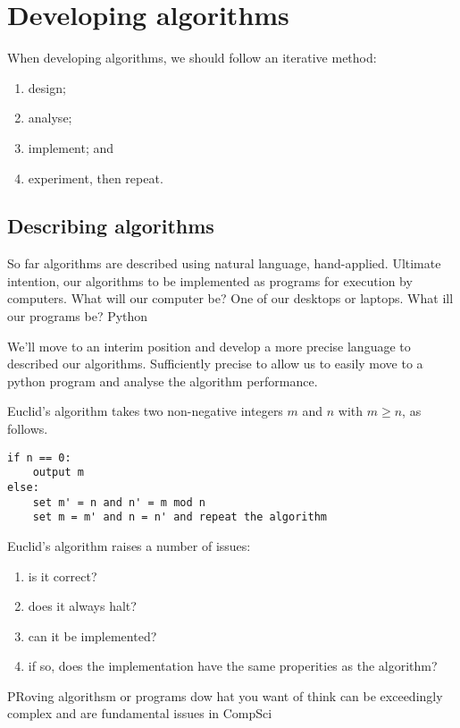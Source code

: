 \chapter{Developing algorithms}

When developing algorithms, we should follow an iterative method:

\begin{enumerate}
    \item design;
    \item analyse;
    \item implement; and
    \item experiment, then repeat.
\end{enumerate}

\section{Describing algorithms}

So far algorithms are described using natural language, hand-applied. Ultimate intention, our algorithms to be implemented as programs for execution by computers. What will our computer be? One of our desktops or laptops. What ill our programs be? Python

We'll move to an interim position and develop a more precise language to described our algorithms. Sufficiently precise to allow us to easily move to a python program and analyse the algorithm performance.

\begin{example}
    Euclid's algorithm takes two non-negative integers $m$ and $n$ with $m\geq n$, as follows.
    \begin{verbatim}
if n == 0:
    output m
else:
    set m' = n and n' = m mod n
    set m = m' and n = n' and repeat the algorithm
    \end{verbatim}
\end{example}

Euclid's algorithm raises a number of issues:
\begin{enumerate}
    \item is it correct?
    \item does it always halt?
    \item can it be implemented?
    \item if so, does the implementation have the same properities as the algorithm?
\end{enumerate}

PRoving algorithsm or programs dow hat you want of think can be exceedingly complex and are fundamental issues in CompSci

